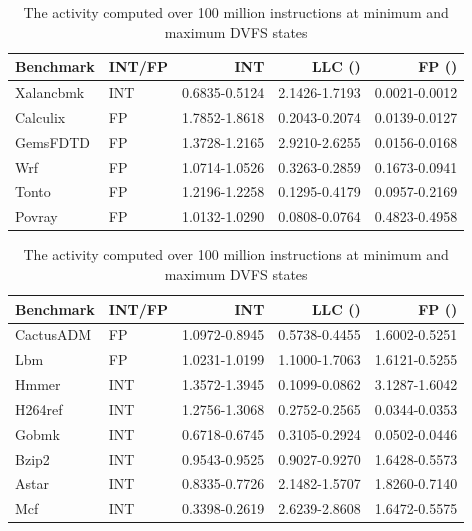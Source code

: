 \begin{table}[htb]
    \centering
    \caption[Microarchitectural component activity range for SPEC benchmarks]{ The activity computed over 100 million instructions at minimum and maximum DVFS states}

        \begin{tabular}{@{}llrrr@{}}
            \toprule
            Benchmark & INT/FP & INT & LLC (\e{-2}) & \textbf{FP (\e{-1})} \\
            \midrule
            Xalancbmk & INT &0.6835-0.5124&2.1426-1.7193&0.0021-0.0012 \\
            Calculix  & FP &1.7852-1.8618&0.2043-0.2074&0.0139-0.0127  \\
            GemsFDTD  & FP &1.3728-1.2165&2.9210-2.6255&0.0156-0.0168  \\
            Wrf       & FP &1.0714-1.0526&0.3263-0.2859&0.1673-0.0941  \\
            Tonto     & FP &1.2196-1.2258&0.1295-0.4179&0.0957-0.2169  \\
            Povray    & FP &1.0132-1.0290&0.0808-0.0764&0.4823-0.4958  \\
            \bottomrule
        \end{tabular}
        
        \vspace{3mm}        
        
        \begin{tabular}{@{}llrrr@{}}
            \toprule
            Benchmark & INT/FP & INT & LLC (\e{-2}) & \textbf{FP (\e{-5})} \\
            \midrule
            CactusADM& FP & 1.0972-0.8945&0.5738-0.4455&1.6002-0.5251 \\
            Lbm      & FP & 1.0231-1.0199&1.1000-1.7063&1.6121-0.5255\\
            Hmmer   & INT &1.3572-1.3945&0.1099-0.0862&3.1287-1.6042\\
            H264ref  & INT &1.2756-1.3068&0.2752-0.2565&0.0344-0.0353\\
            Gobmk    & INT  &0.6718-0.6745&0.3105-0.2924&0.0502-0.0446\\
            Bzip2    &INT   &0.9543-0.9525&0.9027-0.9270&1.6428-0.5573\\
            Astar    & INT   &0.8335-0.7726&2.1482-1.5707&1.8260-0.7140\\
            Mcf       &INT  &0.3398-0.2619&2.6239-2.8608&1.6472-0.5575\\
           \bottomrule
        \end{tabular}

    \label{tab: activity ratio}
\end{table}

